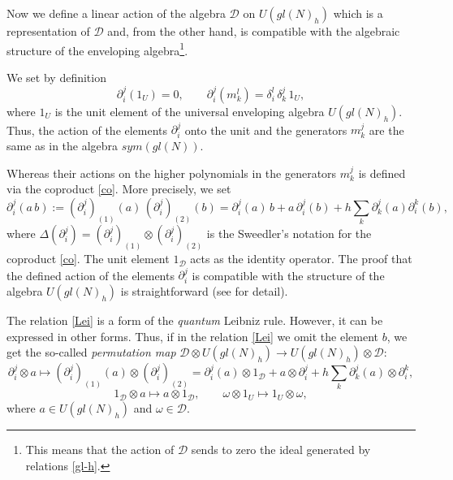 \documentclass[11pt]{article}
\newcommand{\pa}{\partial}
\newcommand{\hl}{m}
\newcommand{\De}{\Delta}
\newcommand{\ot}{\otimes}
\newcommand{\DD}{\mathcal{D}}
\numberwithin{equation}{section}
\theoremstyle{plain}
\theoremstyle{definition}
\begin{document}
Now we define a linear action of the algebra $\DD$ on $U(gl(N)_h)$ which is a representation of $\DD$ and, from the other hand,
is compatible with the algebraic structure of the enveloping algebra\footnote{This means that the action of $\DD$ sends to zero the ideal generated by relations \eqref{gl-h}.}.

We set by definition
\begin{equation}
\partial_i^j(1_{U} ) = 0,\qquad \partial_i^j(\hl_k^l) = \delta_i^l\,\delta_k^j\,1_U,
\label{gen-act}
\end{equation}
where $1_U$ is the unit element of the universal enveloping algebra $U(gl(N)_h)$. Thus, the action of the elements $\pa_i^j$ onto the unit and the generators $m_k^j$ are the same as in the algebra $sym(gl(N))$. 

Whereas their actions on the higher polynomials in the generators $m_k^j$ is defined via the coproduct \eqref{co}. More precisely, we set
\begin{equation}
\pa_i^j(a\,b):= (\pa_i^j)_{(1)}(a)\, (\pa_i^j)_{(2)}(b) = \partial_i^j(a)\,b+ a\,\partial_i^j(b) +h\sum_k\partial_k^j(a)
\partial_i^k(b),
\label{Lei}
\end{equation}
where $\De(\pa_i^j) = (\pa_i^j)_{(1)}\ot (\pa_i^j)_{(2)}$ is the Sweedler's notation for the coproduct \eqref{co}. The unit element
$1_\DD$ acts as the identity operator. The proof that the defined action of the elements $\pa_i^j$ is compatible with the structure of the algebra $U(gl(N)_h)$ is straightforward (see \cite{GPS2} for detail).

The relation \eqref{Lei} is a form of the {\em quantum} Leibniz rule. However, it can be expressed in other forms. Thus, if in the relation
\eqref{Lei} we omit the element $b$, we get the so-called {\em permutation map} $\DD\otimes U(gl(N)_h)\rightarrow U(gl(N)_h)\otimes \DD:$
\begin{equation}
\pa_i^j\ot a \longmapsto (\pa_i^j)_{(1)}(a)\ot (\pa_i^j)_{(2)} 
= \partial_i^j(a)\otimes 1_\DD+a\otimes \partial_i^j
+h\sum_k\partial_k^j(a)\otimes \partial_i^k, 
\label{first}
\end{equation}
$$
1_\DD\otimes a \longmapsto a\otimes 1_\DD, \qquad
\omega\otimes 1_U\longmapsto 1_U\otimes \omega,
$$
where $a\in U(gl(N)_h)$ and $\omega\in\DD$.
\end{document}

